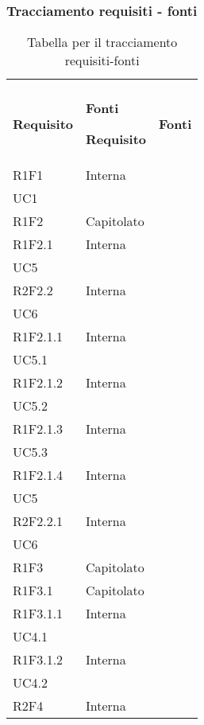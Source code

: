 \newpage
\subsubsection{Tracciamento requisiti - fonti}

\renewcommand{\arraystretch}{2.2}

\begin{longtable}{|C{6.5cm}|C{6.5cm}|}
	\caption{Tabella per il tracciamento requisiti-fonti}\\
	\textbf{Requisito} & \textbf{Fonti} 
	\endfirsthead

	\hline
	
	\textbf{Requisito} & \textbf{Fonti} 
	\tabularnewline
	\endhead
	
	R1F1 & \centering Interna \\ UC1 \tabularnewline
	
	R1F2 & Capitolato \\
	
	R1F2.1 & \centering Interna \\ UC5 \tabularnewline
	
	R2F2.2 & \centering Interna \\ UC6 \tabularnewline
	
	R1F2.1.1 & \centering Interna \\ UC5.1 \tabularnewline
	
	R1F2.1.2 &   \centering Interna \\ UC5.2 \tabularnewline
	
	R1F2.1.3 &  \centering Interna \\ UC5.3 \tabularnewline
	
	R1F2.1.4 &  \centering Interna \\ UC5 \tabularnewline
	
	R2F2.2.1 &  \centering Interna \\ UC6 \tabularnewline
	
	R1F3 & Capitolato \\
	
	R1F3.1 & Capitolato \\
	
	R1F3.1.1 &  \centering Interna \\ UC4.1 \tabularnewline
	
	R1F3.1.2 &  \centering Interna \\ UC4.2 \tabularnewline
	
	R2F4 &  Interna \\
	

\end{longtable}
